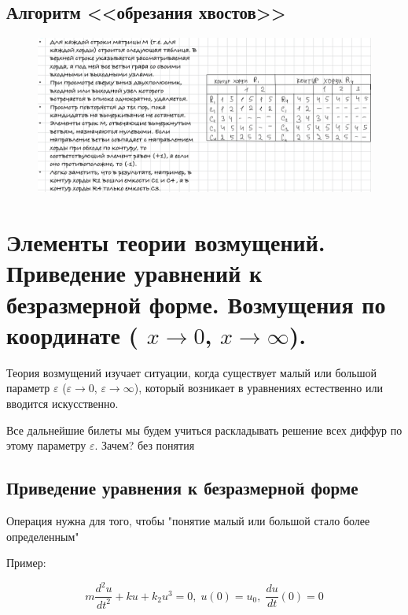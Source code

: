 	\vspace{-1em}
	
	\subsection{Алгоритм <<обрезания хвостов>>}
	
	\vspace{-1em}
	\begin{figure}[H]
		\centering
		\includegraphics[width=1\linewidth, height=0.3\textheight]{img/25_03}
		\label{fig:25_03}
	\end{figure}
	
	\newpage
	
	
	\section{Элементы теории возмущений. Приведение уравнений к безразмерной форме. Возмущения по координате ( \(x \to 0\), \(x \to \infty\)).}
	
	Теория возмущений изучает ситуации, когда существует малый или большой параметр $\varepsilon$ ($\varepsilon \to 0$, $\varepsilon \to \infty$), который возникает в уравнениях естественно или вводится искусственно. 
	
	Все дальнейшие билеты мы будем учиться раскладывать решение всех диффур по этому параметру $\varepsilon$. Зачем? без понятия
	
	\subsection{Приведение уравнения к безразмерной форме}
	
	Операция нужна для того, чтобы "понятие малый или большой стало более определенным"
	
	Пример:
	
	\begin{equation}
		m \frac{d^2u}{dt^2} + ku + k_2u^3 = 0, \; u(0) = u_0, \; \frac{du}{dt}(0) = 0
	\end{equation}
	
